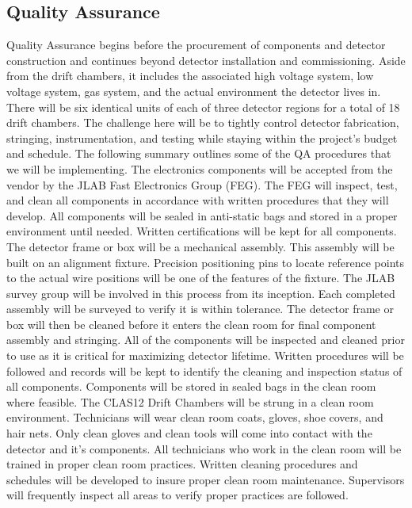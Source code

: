 \subsection{Quality Assurance}
	Quality Assurance begins before the procurement of components and detector 
construction 
and continues beyond detector installation and commissioning. Aside from the drift chambers, 
it includes the associated high voltage system, low voltage system, gas system, and the actual 
environment the detector lives in. There will be six identical units of each of three detector 
regions for a total of 18 drift chambers. The challenge here will be to tightly control detector 
fabrication, stringing, instrumentation, and testing while staying within the project's budget 
and schedule. The following summary outlines some of the QA procedures that we will be 
implementing.
	The electronics components will be accepted from the vendor by the JLAB Fast Electronics 
Group (FEG). The FEG will inspect, test, and clean all components in accordance with written 
procedures that they will develop. All components will be sealed in anti-static bags and stored 
in a proper environment until needed. Written certifications will be kept for all components.
	The detector frame or box will be a mechanical assembly. This assembly will be built 
on an alignment fixture. Precision positioning pins to locate reference points to the actual 
wire positions will be one of the features of the fixture. The JLAB survey group will be 
involved in this process from its inception. Each completed assembly will be surveyed to verify 
it is within tolerance. The detector frame or box will then be cleaned before it enters the 
clean room for final component assembly and stringing.
	All of the components will be inspected and cleaned prior to use as it is critical for 
maximizing detector lifetime. Written procedures will be followed and records will be kept to 
identify the cleaning and inspection status of all components. Components will be stored in 
sealed bags in the clean room where feasible.
	The CLAS12 Drift Chambers will be strung in a clean room environment. Technicians will 
wear clean room coats, gloves, shoe covers, and hair nets. Only clean gloves and clean tools 
will come into contact with the detector and it's components. All technicians who work in the 
clean room will be trained in proper clean room practices. Written cleaning procedures and 
schedules will be developed to insure proper clean room maintenance. Supervisors will frequently 
inspect all areas to verify proper practices are followed.
